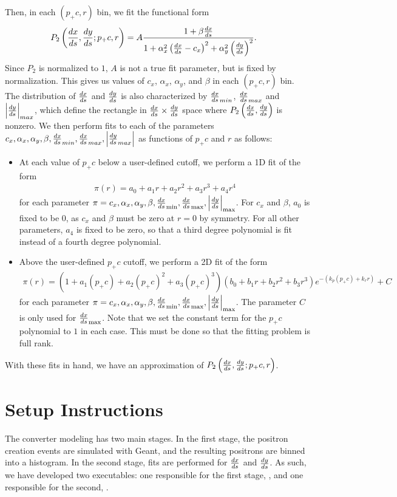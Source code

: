 \documentclass[12pt]{article}
\begin{document}
Then, in each $(p_+ c, r)$ bin, we fit the functional form
\begin{align}
P_2 \left( \frac{dx}{ds}, \frac{dy}{ds}; p_+ c, r \right) & = A \frac{1 + \beta \frac{dx}{ds}}{1 + \alpha_x^2 \left( \frac{dx}{ds} - c_x \right)^2 + \alpha_y^2 \left( \frac{dy}{ds} \right)^2}. \label{eq:cauchy}
\end{align}
Since $P_2$ is normalized to $1$, $A$ is not a true fit parameter, but is fixed by normalization.
This gives us values of $c_x$, $\alpha_x$, $\alpha_y$, and $\beta$ in each $(p_+ c, r)$ bin.
The distribution of $\frac{dx}{ds}$ and $\frac{dy}{ds}$ is also characterized by $\frac{dx}{ds}_{min}$, $\frac{dx}{ds}_{max}$ and $\left| \frac{dy}{ds} \right|_{max}$,
which define the rectangle in $\frac{dx}{ds} \times \frac{dy}{ds}$ space where $P_2 \left( \frac{dx}{ds}, \frac{dy}{ds} \right)$ is nonzero.
We then perform fits to each of the parameters $c_x, \alpha_x, \alpha_y, \beta, \frac{dx}{ds}_{min}, \frac{dx}{ds}_{max}, \left| \frac{dy}{ds}_{max} \right|$ as functions of $p_+ c$ and $r$ as follows:
\begin{itemize}
\item
At each value of $p_+ c$ below a user-defined cutoff, we perform a 1D fit of the form
\begin{align}
\pi(r) = a_0 + a_1 r+ a_2 r^2 + a_3 r^3 + a_4 r^4 \label{eq:fit1}
\end{align}
for each parameter $\pi =c_x, \alpha_x, \alpha_y, \beta, \frac{dx}{ds}_{\mathrm{min}}, \frac{dx}{ds}_{\mathrm{max}}, \left| \frac{dy}{ds} \right|_{\mathrm{max}}$.
For $c_x$ and $\beta$, $a_0$ is fixed to be 0, as $c_x$ and $\beta$ must be zero at $r=0$ by symmetry.
For all other parameters, $a_4$ is fixed to be zero, so that a third degree polynomial is fit instead of a fourth degree polynomial.

\item
Above the user-defined $p_+ c$ cutoff, we perform a 2D fit of the form
\begin{align}
\pi(r) = (1 + a_1 (p_+c) + a_2 (p_+c)^2 + a_3 (p_+c)^3)
         (b_0 + b_1 r + b_2 r^2 + b_3 r^3) e^{-(k_p (p_+ c) + k_r r)} + C \label{eq:fit2}
\end{align}
for each parameter $\pi =c_x, \alpha_x, \alpha_y, \beta, \frac{dx}{ds}_{\mathrm{min}}, \frac{dx}{ds}_{\mathrm{max}}, \left| \frac{dy}{ds} \right|_{\mathrm{max}}$.
The parameter $C$ is only used for $\frac{dx}{ds}_{\mathrm{max}}$.
Note that we set the constant term for the $p_+ c$ polynomial to $1$ in each case.
This must be done so that the fitting problem is full rank.

\end{itemize}
With these fits in hand, we have an approximation of $P_2 \left( \frac{dx}{ds}, \frac{dy}{ds}; p_+ c, r \right)$.



\section{Setup Instructions}
The converter modeling has two main stages.
In the first stage, the positron creation events are simulated with Geant, and the resulting positrons are binned into a histogram.
In the second stage, fits are performed for $\frac{dx}{ds}$ and $\frac{dy}{ds}$.
As such, we have developed two executables: one responsible for the first stage, \exes, and one responsible for the second, \exef.
\end{document}
